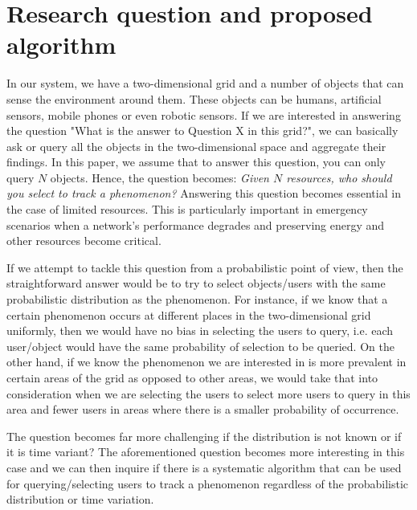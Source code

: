 \documentclass{acm_proc_article-sp}
\begin{document}
\section{Research question and proposed algorithm}
In our system, we have a two-dimensional grid and a number of objects that can sense the environment around them. These objects can be humans, artificial sensors, mobile phones or even robotic sensors. If we are interested in answering the question "What is the answer to Question X in this grid?", we can basically ask or query all the objects in the two-dimensional space and aggregate their findings. In this paper, we assume that to answer this question, you can only query $N$ objects. Hence, the question becomes: \textit{Given $N$ resources, who should you select to track a phenomenon?} Answering this question becomes essential in the case of limited resources. This is particularly important in emergency scenarios when a network's performance degrades and preserving energy and other resources become critical.\par
If we attempt to tackle this question from a probabilistic point of view, then the straightforward answer would be to try to select objects/users with the same probabilistic distribution as the phenomenon. For instance, if we know that a certain phenomenon occurs at different places in the two-dimensional grid uniformly, then we would have no bias in selecting the users to query, i.e. each user/object would have the same probability of selection to be queried. On the other hand, if we know the phenomenon we are interested in is more prevalent in certain areas of the grid as opposed to other areas, we would take that into consideration when we are selecting the users to select more users to query in this area and fewer users in areas where there is a smaller probability of occurrence.\par
The question becomes far more challenging if the distribution is not known or if it is time variant? The aforementioned question becomes more interesting in this case and we can then inquire if there is a systematic algorithm that can be used for querying/selecting users to track a phenomenon regardless of the probabilistic distribution or time variation. \par
\end{document}

